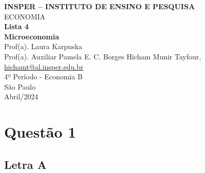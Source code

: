 \documentclass[a4paper,12pt]{article}[abntex2]
\begin{document}
\begin{titlepage}
    \centering
    \vspace*{1cm}
    \Large\textbf{INSPER – INSTITUTO DE ENSINO E PESQUISA}\\
    \Large ECONOMIA\\
    \vspace{1.5cm}
    \Large\textbf{Lista 4}\\
    \textbf{Microeconomia}\\
    \vspace{1.5cm}
    Prof(a). Laura Karpuska \\
    Prof(a). Auxiliar  Pamela E. C. Borges
    \vfill
    \normalsize
    Hicham Munir Tayfour, \href{mailto:hichamt@al.insper.edu.br}{hichamt@al.insper.edu.br}\\
    4º Período - Economia B\\
    \vfill
    São Paulo\\
    Abril/2024
\end{titlepage}

\newpage

\newpage
\tableofcontents
\thispagestyle{empty} %
\newpage
\setcounter{page}{1} %
\justify
\onehalfspacing

\pagestyle{fancy}
\fancyhf{}
\rhead{\thepage}



\section{\textbf{Questão 1}}
\subsection{\textbf{Letra A}}
\end{document}
